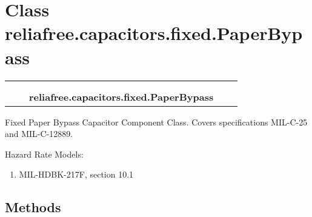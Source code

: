 %
%
%


\section{Class reliafree.capacitors.fixed.PaperBypass}

    \label{reliafree:capacitors:fixed:PaperBypass}
\begin{tabular}{cccccc}
\multicolumn{2}{r}{\settowidth{\BCL}{reliafree.capacitors.capacitor.Capacitor}\multirow{2}{\BCL}{reliafree.capacitors.capacitor.Capacitor}}
&&
  \\\cline{3-3}
  &&\multicolumn{1}{c|}{}
&&
  \\
&&\multicolumn{2}{l}{\textbf{reliafree.capacitors.fixed.PaperBypass}}
\end{tabular}

Fixed Paper Bypass Capacitor Component Class. Covers specifications 
MIL-C-25 and MIL-C-12889.

Hazard Rate Models:

\begin{enumerate}

\setlength{\parskip}{0.5ex}
  \item MIL-HDBK-217F, section 10.1

\end{enumerate}



  \subsection{Methods}

    \vspace{0.5ex}


